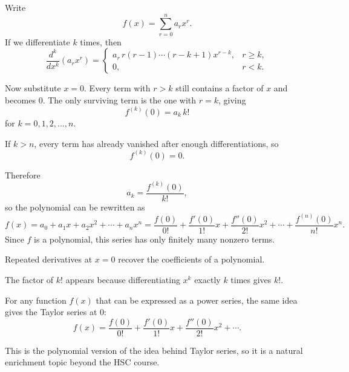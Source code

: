 \begin{solution}
Write
\[
f(x)=\sum_{r=0}^{n} a_r x^r.
\]
If we differentiate $k$ times, then
\[
\frac{d^k}{dx^k}(a_r x^r)=
\begin{cases}
a_r\,r(r-1)\cdots (r-k+1)x^{r-k}, & r\ge k,\\
0, & r<k.
\end{cases}
\]

Now substitute $x=0$. Every term with $r>k$ still contains a factor of $x$ and becomes $0$. The only surviving term is the one with $r=k$, giving
\[
f^{(k)}(0)=a_k\,k!
\]
for $k=0,1,2,\dots,n$.

If $k>n$, every term has already vanished after enough differentiations, so
\[
f^{(k)}(0)=0.
\]

Therefore
\[
a_k=\frac{f^{(k)}(0)}{k!},
\]
so the polynomial can be rewritten as
\[
f(x)=a_0+a_1x+a_2x^2+\cdots+a_nx^n
=\frac{f(0)}{0!}+\frac{f'(0)}{1!}x+\frac{f''(0)}{2!}x^2+\cdots+\frac{f^{(n)}(0)}{n!}x^n.
\]
Since $f$ is a polynomial, this series has only finitely many nonzero terms.
\end{solution}

\begin{takeaways}
\item Repeated derivatives at $x=0$ recover the coefficients of a polynomial.
\item The factor of $k!$ appears because differentiating $x^k$ exactly $k$ times gives $k!$.
\item For any function $f(x)$ that can be expressed as a power series, the same idea gives the Taylor series at $0$:
\[
f(x)=\frac{f(0)}{0!}+\frac{f'(0)}{1!}x+\frac{f''(0)}{2!}x^2+\cdots.
\]
\item This is the polynomial version of the idea behind Taylor series, so it is a natural enrichment topic beyond the HSC course.
\end{takeaways}

